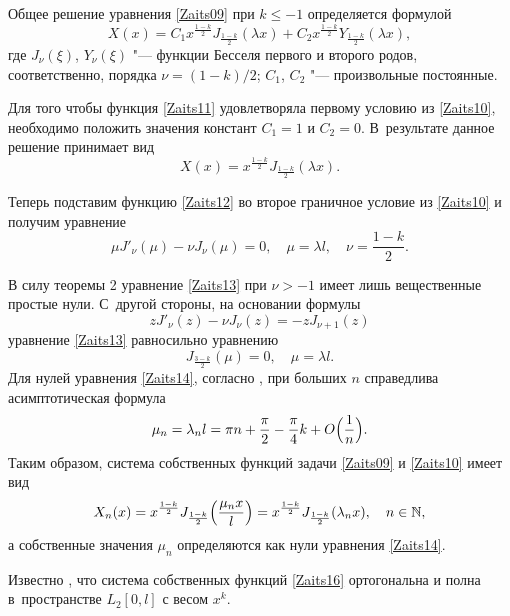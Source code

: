 Общее решение уравнения \eqref{Zaits09} при $k\leq-1$ определяется формулой
\begin{equation}
\label{Zaits11}
X(x)=C_1x^{\frac{1-k}{2}}J_{\frac{1-k}{2}}(\lambda x)+C_2x^{\frac{1-k}{2}}Y_{\frac{1-k}{2}}(\lambda x),
\end{equation}
где $\displaystyle J_{\nu}(\xi)$, $\displaystyle Y_{\nu}(\xi)$ "--- функции Бесселя первого и второго родов, соответственно, порядка $\nu=({1-k})/{2}$; $C_1$, $C_2$ "--- произвольные постоянные.

Для того чтобы функция \eqref{Zaits11} удовлетворяла первому условию из \eqref{Zaits10}, необходимо положить значения констант $C_1=1$ и $C_2=0$. 
В~результате данное решение принимает вид
\begin{equation}
\label{Zaits12}
X(x)=x^{\frac{1-k}{2}}J_{\frac{1-k}{2}}(\lambda x).
\end{equation}

Теперь подставим функцию \eqref{Zaits12} во второе граничное условие из \eqref{Zaits10} и получим уравнение
\begin{equation}
\label{Zaits13}
\mu J'_\nu(\mu)-\nu J_\nu(\mu)=0,\quad  \mu=\lambda l,\quad \nu=\frac{1-k}{2}.
\end{equation}

В силу теоремы 2 \cite[c.~310]{Zaitseva:SKB3} уравнение \eqref{Zaits13} при $\nu>-1$ имеет лишь вещественные простые нули. 
С~другой стороны, на основании формулы \cite[c.~305]{Zaitseva:SKB3}
$$zJ'_\nu(z)-\nu J_\nu(z)=-zJ_{\nu+1}(z)$$
уравнение \eqref{Zaits13} равносильно уравнению
\begin{equation}
\label{Zaits14} 
J_{\frac{3-k}{2}}(\mu)=0,\quad  \mu=\lambda l.
\end{equation}
Для нулей уравнения \eqref{Zaits14}, согласно \cite[c.~317]{Zaitseva:Olv}, при больших $n$ справедлива асимптотическая формула
\begin{equation}
\label{Zaits15}
\mu_n=\lambda_nl=\pi n+\frac{\pi}{2}-\frac{\pi}{4}k+O\Bigl(\frac1n\Bigr).
\end{equation}
Таким образом, система собственных функций задачи \eqref{Zaits09} и \eqref{Zaits10} имеет вид
\begin{equation}
\label{Zaits16}
X_n(x)=x^{\frac{1-k}{2}}J_{\frac{1-k}{2}} \Bigl(\frac{\mu_n x}{l} \Bigr)=x^{\frac{1-k}{2}}J_{\frac{1-k}{2}}(\lambda_n x),\quad  n\in \mathbb{N},
\end{equation}
а собственные значения $\mu_n$ определяются как нули уравнения \eqref{Zaits14}.

Известно \cite[c.~308--315]{Zaitseva:SKB3}, что система собственных функций \eqref{Zaits16} ортогональна и полна в~пространстве $L_2[0, l]$ с весом $x^k$.

